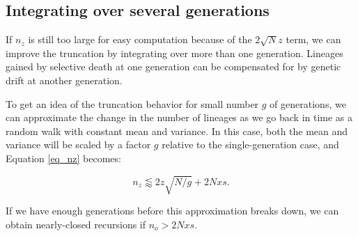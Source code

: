 \documentclass[review]{elsarticle}
\newcommand{\sgcomment}[1]{{\color{red}{SG: #1}}}
\begin{document}
\subsection{Integrating over several generations} 

If $n_z$ is still too large for easy computation because of the $2 \sqrt{N} z$ term, we can improve 
the truncation by integrating over more than one generation.
Lineages gained by selective death at one generation can be compensated for by genetic drift at
another generation.

To get an idea of the truncation behavior for small number $g$ of generations, we can approximate 
the change  in the number of lineages as we go back in time as a random walk with constant mean and 
variance. In this case, both the mean and variance will be scaled by a factor $g$ relative 
to the single-generation case, and Equation \eqref{eq_nz} becomes:

\begin{equation}
  n_z \lessapprox 2 z\sqrt{N/g} + 2N x s.
\label{eq_nzg}
\end{equation}

If we have enough generations before this approximation breaks down, we can obtain nearly-closed recursions if $n_o> 2Nxs.$  
\sgcomment{Put the following paragraph in appendix?}
\end{document}
